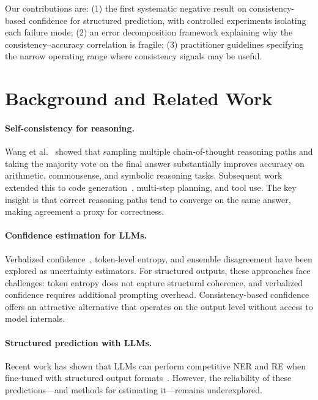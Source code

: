 \documentclass[11pt,a4paper]{article}
\begin{document}
Our contributions are:
(1) the first systematic negative result on consistency-based confidence for structured prediction, with controlled experiments isolating each failure mode;
(2) an error decomposition framework explaining why the consistency--accuracy correlation is fragile;
(3) practitioner guidelines specifying the narrow operating range where consistency signals may be useful.

\section{Background and Related Work}

\paragraph{Self-consistency for reasoning.}
Wang et al.~\cite{wang2023selfconsistency} showed that sampling multiple chain-of-thought reasoning paths and taking the majority vote on the final answer substantially improves accuracy on arithmetic, commonsense, and symbolic reasoning tasks.
Subsequent work extended this to code generation~\cite{chen2023codet}, multi-step planning, and tool use.
The key insight is that correct reasoning paths tend to converge on the same answer, making agreement a proxy for correctness.

\paragraph{Confidence estimation for LLMs.}
Verbalized confidence~\cite{kadavath2022language}, token-level entropy, and ensemble disagreement have been explored as uncertainty estimators.
For structured outputs, these approaches face challenges: token entropy does not capture structural coherence, and verbalized confidence requires additional prompting overhead.
Consistency-based confidence offers an attractive alternative that operates on the output level without access to model internals.

\paragraph{Structured prediction with LLMs.}
Recent work has shown that LLMs can perform competitive NER and RE when fine-tuned with structured output formats~\cite{li2023evaluating,wadhwa2023revisiting}.
However, the reliability of these predictions---and methods for estimating it---remains underexplored.
\end{document}
